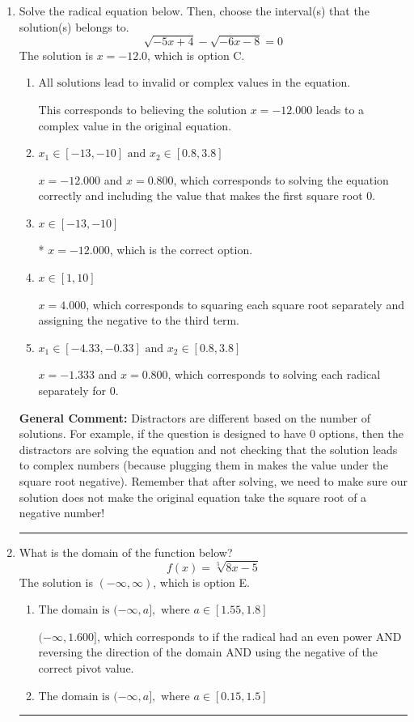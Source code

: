 \documentclass{extbook}[14pt]
\newcommand{\litem}[1]{\item #1

\rule{\textwidth}{0.4pt}}
\begin{document}
\begin{enumerate}\litem{
Solve the radical equation below. Then, choose the interval(s) that the solution(s) belongs to.
\[ \sqrt{-5 x + 4} - \sqrt{-6 x - 8} = 0 \]The solution is \( x = -12.0 \), which is option C.\begin{enumerate}[label=\Alph*.]
\item \( \text{All solutions lead to invalid or complex values in the equation.} \)

This corresponds to believing the solution $x = -12.000$ leads to a complex value in the original equation.
\item \( x_1 \in [-13, -10] \text{ and } x_2 \in [0.8,3.8] \)

$x = -12.000$ and $x = 0.800$, which corresponds to solving the equation correctly and including the value that makes the first square root 0.
\item \( x \in [-13,-10] \)

* $x = -12.000$, which is the correct option.
\item \( x \in [1,10] \)

$x = 4.000$, which corresponds to squaring each square root separately and assigning the negative to the third term.
\item \( x_1 \in [-4.33, -0.33] \text{ and } x_2 \in [0.8,3.8] \)

$x = -1.333$ and $x = 0.800$, which corresponds to solving each radical separately for 0.
\end{enumerate}

\textbf{General Comment:} Distractors are different based on the number of solutions. For example, if the question is designed to have 0 options, then the distractors are solving the equation and not checking that the solution leads to complex numbers (because plugging them in makes the value under the square root negative). Remember that after solving, we need to make sure our solution does not make the original equation take the square root of a negative number!
}
\litem{
What is the domain of the function below?
\[ f(x) = \sqrt[5]{8 x - 5} \]The solution is \( (-\infty, \infty) \), which is option E.\begin{enumerate}[label=\Alph*.]
\item \( \text{The domain is } (-\infty, a], \text{   where } a \in [1.55, 1.8] \)

$(-\infty, 1.600]$, which corresponds to if the radical had an even power AND reversing the direction of the domain AND using the negative of the correct pivot value.
\item \( \text{The domain is } (-\infty, a], \text{   where } a \in [0.15, 1.5] \)


\end{enumerate}}
\end{enumerate}
\end{document}
